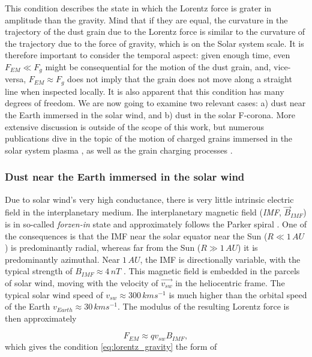 This condition describes the state in which the Lorentz force is grater in amplitude than the gravity. Mind that if they are equal, the curvature in the trajectory of the dust grain due to the Lorentz force is similar to the curvature of the trajectory due to the force of gravity, which is on the Solar system scale. It is therefore important to consider the temporal aspect: given enough time, even $F_{EM} \ll F_g$ might be consequential for the motion of the dust grain, and, vice-versa, $F_{EM} \approx F_g$ does not imply that the grain does not move along a straight line when inspected locally. It is also apparent that this condition has many degrees of freedom. We are now going to examine two relevant cases: a) dust near the Earth immersed in the solar wind, and b) dust in the solar F-corona. More extensive discussion is outside of the scope of this work, but numerous publications dive in the topic of the motion of charged grains immersed in the solar system plasma \citep{mann2007nanoparticles,stamm2019dust,czechowski2021dynamics,poppe2022effects}, as well as the grain charging processes \citep{meyer1982flip,vaverka2016lunar}.

\subsubsection{Dust near the Earth immersed in the solar wind}

Due to solar wind's very high conductance, there is very little intrinsic electric field in the interplanetary medium. Ihe interplanetary magnetic field (\textit{IMF}, $\vec{B}_{IMF}$) is in so-called \textit{forzen-in} state and approximately follows the Parker spiral \citep{parker1958dynamics}. One of the consequences is that the IMF near the solar equator near the Sun ($R \ll 1 \, \si{AU}$) is predominantly radial, whereas far from the Sun ($R \gg 1 \, \si{AU}$) it is predominantly azimuthal. Near $1 \, \si{AU}$, the IMF is directionally variable, with the typical strength of $B_{IMF} \approx 4 \, \si{nT}$ \citep{mann2007nanoparticles}. This magnetic field is  embedded in the parcels of solar wind, moving with the velocity of $\vec{v_{sw}}$ in the heliocentric frame. The typical solar wind speed of $v_{sw} \approx 300 \, \si{km s^{-1}}$ is much higher than the orbital speed of the Earth $v_{Earth} \approx 30 \, \si{km s^{-1}}$. The modulus of the resulting Lorentz force is then approximately 

\begin{equation}
    F_{EM} \approx q v_{sw} B_{IMF},
\end{equation}
which gives the condition \ref{eq:lorentz_gravity} the form of

